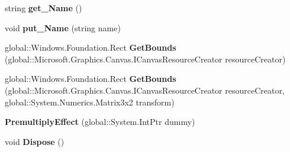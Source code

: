 \begin{DoxyCompactItemize}
\item 
\mbox{\label{class_microsoft_1_1_graphics_1_1_canvas_1_1_effects_1_1_premultiply_effect_ab9deb479410abba643b6a4e1650bc048}} 
string {\bfseries get\+\_\+\+Name} ()
\item 
\mbox{\label{class_microsoft_1_1_graphics_1_1_canvas_1_1_effects_1_1_premultiply_effect_ae2c6e17d6ad14c7d19658f450781811a}} 
void {\bfseries put\+\_\+\+Name} (string name)
\item 
\mbox{\label{class_microsoft_1_1_graphics_1_1_canvas_1_1_effects_1_1_premultiply_effect_a47fdc5928f2f49a98c50255a72422ff2}} 
global\+::\+Windows.\+Foundation.\+Rect {\bfseries Get\+Bounds} (global\+::\+Microsoft.\+Graphics.\+Canvas.\+I\+Canvas\+Resource\+Creator resource\+Creator)
\item 
\mbox{\label{class_microsoft_1_1_graphics_1_1_canvas_1_1_effects_1_1_premultiply_effect_a947b24f370b9b36c3b160ab2faa72fcd}} 
global\+::\+Windows.\+Foundation.\+Rect {\bfseries Get\+Bounds} (global\+::\+Microsoft.\+Graphics.\+Canvas.\+I\+Canvas\+Resource\+Creator resource\+Creator, global\+::\+System.\+Numerics.\+Matrix3x2 transform)
\item 
\mbox{\label{class_microsoft_1_1_graphics_1_1_canvas_1_1_effects_1_1_premultiply_effect_a8186cf7bd26fe373a3ab0216db4f0f3a}} 
{\bfseries Premultiply\+Effect} (global\+::\+System.\+Int\+Ptr dummy)
\item 
\mbox{\label{class_microsoft_1_1_graphics_1_1_canvas_1_1_effects_1_1_premultiply_effect_a5fc45f472f6b09a3d1441141d658dbce}} 
void {\bfseries Dispose} ()
\item 
\mbox{\label{class_microsoft_1_1_graphics_1_1_canvas_1_1_effects_1_1_premultiply_effect_a8c8c30dc5766fa4177f8eae0c877a43b}} 

\end{DoxyCompactItemize}
